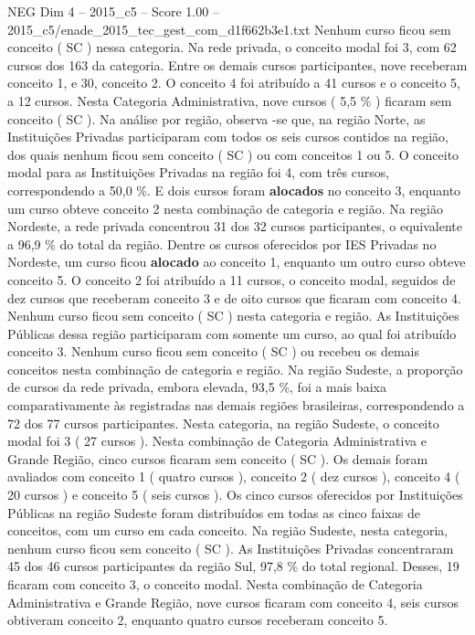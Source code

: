 \begin{textsample}{NEG Dim 4 – 2015\_c5 – Score 1.00 – 2015\_c5/enade\_2015\_tec\_gest\_com\_d1f662b3e1.txt}
Nenhum curso ficou sem conceito ( SC ) nessa categoria.
Na rede privada, o conceito modal foi 3, com 62 cursos dos 163 da categoria.
Entre os demais cursos participantes, nove receberam conceito 1, e 30, conceito 2.
O conceito 4 foi atribuído a 41 cursos e o conceito 5, a 12 cursos.
Nesta Categoria Administrativa, nove cursos ( 5,5 \% ) ficaram sem conceito ( SC ).
Na análise por região, observa -se que, na região Norte, as Instituições Privadas participaram com todos os seis cursos contidos na região, dos quais nenhum ficou sem conceito ( SC ) ou com conceitos 1 ou 5.
O conceito modal para as Instituições Privadas na região foi 4, com três cursos, correspondendo a 50,0 \%.
E dois cursos foram \textbf{alocados} no conceito 3, enquanto um curso obteve conceito 2 nesta combinação de categoria e região.
Na região Nordeste, a rede privada concentrou 31 dos 32 cursos participantes, o equivalente a 96,9 \% do total da região.
Dentre os cursos oferecidos por IES Privadas no Nordeste, um curso ficou \textbf{alocado} ao conceito 1, enquanto um outro curso obteve conceito 5.
O conceito 2 foi atribuído a 11 cursos, o conceito modal, seguidos de dez cursos que receberam conceito 3 e de oito cursos que ficaram com conceito 4.
Nenhum curso ficou sem conceito ( SC ) nesta categoria e região.
As Instituições Públicas dessa região participaram com somente um curso, ao qual foi atribuído conceito 3.
Nenhum curso ficou sem conceito ( SC ) ou recebeu os demais conceitos nesta combinação de categoria e região.
Na região Sudeste, a proporção de cursos da rede privada, embora elevada, 93,5 \%, foi a mais baixa comparativamente às registradas nas demais regiões brasileiras, correspondendo a 72 dos 77 cursos participantes.
Nesta categoria, na região Sudeste, o conceito modal foi 3 ( 27 cursos ).
Nesta combinação de Categoria Administrativa e Grande Região, cinco cursos ficaram sem conceito ( SC ).
Os demais foram avaliados com conceito 1 ( quatro cursos ), conceito 2 ( dez cursos ), conceito 4 ( 20 cursos ) e conceito 5 ( seis cursos ).
Os cinco cursos oferecidos por Instituições Públicas na região Sudeste foram distribuídos em todas as cinco faixas de conceitos, com um curso em cada conceito.
Na região Sudeste, nesta categoria, nenhum curso ficou sem conceito ( SC ).
As Instituições Privadas concentraram 45 dos 46 cursos participantes da região Sul, 97,8 \% do total regional.
Desses, 19 ficaram com conceito 3, o conceito modal.
Nesta combinação de Categoria Administrativa e Grande Região, nove cursos ficaram com conceito 4, seis cursos obtiveram conceito 2, enquanto quatro cursos receberam conceito 5.

\end{textsample}
